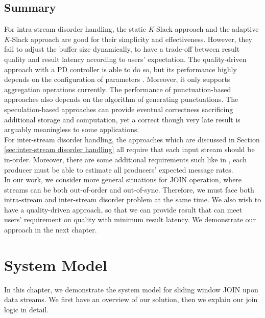 \documentclass[a4paper, 11pt, twoside]{report}
\begin{document}
\section{Summary}
\label{sec:summary-intrastream}

For intra-stream disorder handling, the static \textit{K}-Slack approach and the adaptive \textit{K}-Slack approach are good for their simplicity and effectiveness. However, they fail to adjust the buffer size dynamically, to have a trade-off between result quality and result latency according to users' expectation. The quality-driven approach with a PD controller is able to do so, but its performance highly depends on the configuration of parameters \cite{Lisa}. Moreover, it only supports aggregation operations currently. The performance of punctuation-based approaches also depends on the algorithm of generating punctuations. The speculation-based approaches can provide eventual correctness sacrificing additional storage and computation, yet a correct though very late result is arguably meaningless to some applications.\\

For inter-stream disorder handling, the approaches which are discussed in Section \ref{sec:inter-stream disorder handling} all require that each input stream should be in-order. Moreover, there are some additional requirements such like in \cite{Aguilera:2000:EAB:343477.343620}, each producer must be able to estimate all producers' expected message rates.\\

In our work, we consider more general situations for JOIN operation, where streams can be both out-of-order and out-of-sync. Therefore, we must face both intra-stream and inter-stream disorder problem at the same time. We also wish to have a quality-driven approach, so that we can provide result that can meet users' requirement on quality with minimum result latency. We demonstrate our approach in the next chapter.\\


\cleardoublepage

\chapter{System Model}
\label{chapter:system-model}

In this chapter, we demonstrate the system model for sliding window JOIN upon data streams. We first have an overview of our solution, then we explain our join logic in detail.\\
\end{document}
